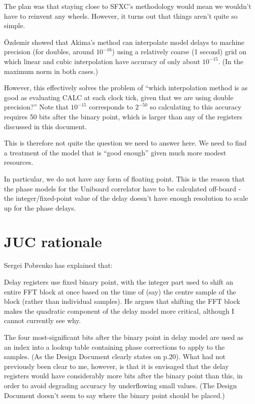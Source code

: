 \documentclass[a4paper]{article}
\begin{document}
The plan was that staying close to SFXC's methodology would mean we wouldn't have to reinvent any wheels.  However, it turns out that things aren't quite so simple.

Özdemir\cite{hus} showed that Akima's method can interpolate model delays to machine precision (for doubles, around $10^{-16}$) using a relatively coarse (1 second) grid on which linear and cubic interpolation have accuracy of only about $10^{-15}$.  (In the maximum norm in both cases.)

However, this effectively solves the problem of ``which interpolation method is as good as evaluating CALC at each clock tick, given that we are using double precision?''  Note that $10^{-15}$ corresponds to $2^{-50}$ so calculating to this accuracy requires 50 bits after the binary point, which is larger than any of the registers discussed in this document.

This is therefore not quite the question we need to answer here.  We need to find a treatment of the model that is ``good enough'' given much more modest resources.

In particular, we do not have any form of floating point.  This is the reason that the phase models for the Uniboard correlator have to be calculated off-board - the integer/fixed-point value of the delay doesn't have enough resolution to scale up for the phase delays.

\section{JUC rationale}

Sergei Pobrenko has explained that:

Delay registers use fixed binary point, with the integer part used to shift an entire FFT block at once based on the time of (say) the centre sample of the block (rather than individual samples).  He argues that shifting the FFT block makes the quadratic component of the delay model more critical, although I cannot currently see why.

The four most-significant bits after the binary point in delay model are used as an index into a lookup table containing phase corrections to apply to the samples. (As the Design Document\cite{unib} clearly states on p.20).  What had not previously been clear to me, however, is that it is envisaged that the delay registers would have considerably more bits after the binary point than this, in order to avoid degrading accuracy by underflowing small values.  (The Design Document doesn't seem to say where the binary point should be placed.)
\end{document}
